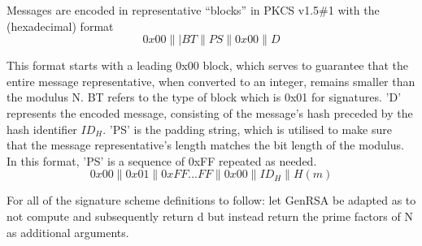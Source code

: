 \documentclass[]{final_report}
\theoremstyle{definition}
\begin{document}
Messages are encoded in representative “blocks” in PKCS v1.5\#1 with the (hexadecimal) format
\[0x00\||BT\|PS\|0x00\|D\]

This format starts with a leading 0x00 block, which serves to guarantee that the entire message representative, when converted to an integer, remains smaller than the modulus N. BT refers to the type of block which is 0x01 for signatures. 'D' represents the encoded message, consisting of the message's hash preceded by the hash identifier $ID_{H}$. 'PS' is the padding string, which is utilised to make sure that the message representative's length matches the bit length of the modulus. In this format, 'PS' is a sequence of 0xFF repeated as needed.
\[0x00\|0x01\|0xFF . . . FF\|0x00\|ID_{H}\|H(m)\]

For all of the signature scheme definitions to follow: let GenRSA be adapted as to not compute and subsequently return d but instead return the prime factors of N as additional arguments.
\end{document}
